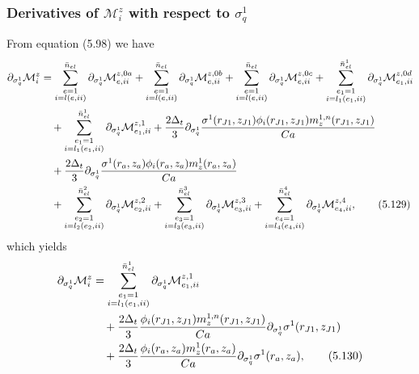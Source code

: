 \documentclass{article}
\begin{document}
\subsubsection{Derivatives of $\mathcal{M}_i^z$ with respect to $\sigma_q^1$} %
From equation (5.98) we have
\begin{align}
\partial_{\sigma_q^1}\mathcal{M}_i^z &= \sum_{\substack{e=1\\ i=l(e,ii)}}^{\bar{n}_{el}} \partial_{\sigma_q^1} \mathcal{M}_{e,ii}^{z,0a} + \sum_{\substack{e=1\\ i=l(e,ii)}}^{\bar{n}_{el}} \partial_{\sigma_q^1} \mathcal{M}_{e,ii}^{z,0b} + \sum_{\substack{e=1\\ i=l(e,ii)}}^{\bar{n}_{el}} \partial_{\sigma_q^1} \mathcal{M}_{e,ii}^{z,0c} + \sum_{\substack{e_1=1\\ i=l_1(e_1,ii)}}^{\bar{n}_{el}^1} \partial_{\sigma_q^1} \mathcal{M}_{e_1,ii}^{z,0d} \nonumber\\
&\quad + \sum_{\substack{e_1=1\\ i=l_1(e_1,ii)}}^{\bar{n}_{el}^1} \partial_{\sigma_q^1} \mathcal{M}_{e_1,ii}^{z,1} + \frac{2\Delta_t}{3} \partial_{\sigma_q^1} \frac{\sigma^1(r_{J1},z_{J1}) \phi_i(r_{J1},z_{J1}) m_z^{1,n}(r_{J1},z_{J1})}{Ca} \nonumber\\
&\quad + \frac{2\Delta_t}{3} \partial_{\sigma_q^1} \frac{\sigma^1(r_a,z_a) \phi_i(r_a,z_a) m_z^{1}(r_a,z_a)}{Ca} \nonumber\\
&\quad + \sum_{\substack{e_2=1\\ i=l_2(e_2,ii)}}^{\bar{n}_{el}^2} \partial_{\sigma_q^1} \mathcal{M}_{e_2,ii}^{z,2} + \sum_{\substack{e_3=1\\ i=l_3(e_3,ii)}}^{\bar{n}_{el}^3} \partial_{\sigma_q^1} \mathcal{M}_{e_3,ii}^{z,3} + \sum_{\substack{e_4=1\\ i=l_4(e_4,ii)}}^{\bar{n}_{el}^4} \partial_{\sigma_q^1} \mathcal{M}_{e_4,ii}^{z,4}, \tag{5.129}
\end{align}
which yields
\begin{align}
\partial_{\sigma_q^1}\mathcal{M}_i^z &= \sum_{\substack{e_1=1\\ i=l_1(e_1,ii)}}^{\bar{n}_{el}^1} \partial_{\sigma_q^1} \mathcal{M}_{e_1,ii}^{z,1} \nonumber\\
&\quad + \frac{2\Delta_t}{3} \frac{\phi_i(r_{J1},z_{J1}) m_z^{1,n}(r_{J1},z_{J1})}{Ca} \partial_{\sigma_q^1} \sigma^1(r_{J1},z_{J1}) \nonumber\\
&\quad + \frac{2\Delta_t}{3} \frac{\phi_i(r_a,z_a) m_z^{1}(r_a,z_a)}{Ca} \partial_{\sigma_q^1} \sigma^1(r_a,z_a), \tag{5.130}
\end{align}
\end{document}
